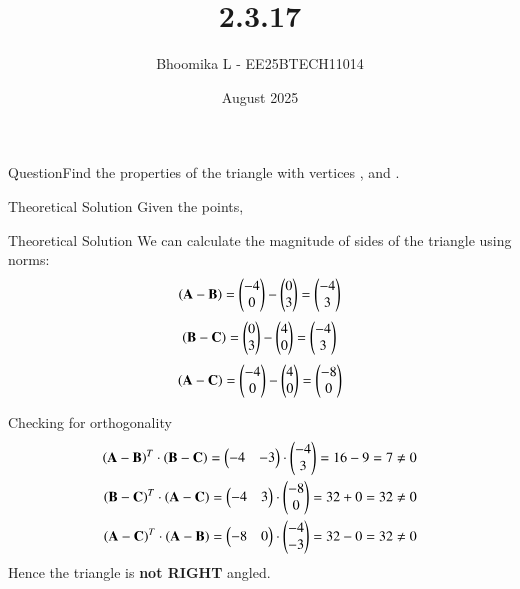 \documentclass{beamer}
\title %
{2.3.17}
\date{August  2025}
\author %
{Bhoomika L - EE25BTECH11014}
\begin{document}
\frame{\titlepage}
\begin{frame}{Question}Find the properties of the triangle with vertices , and .

\end{frame}

\begin{frame}{Theoretical Solution}
Given the points,
\begin{table}[H]    
  \centering
  
  \caption{Variables used.}
  \label{tab:2.3.17}
\end{table}
\end{frame}

\begin{frame}{Theoretical Solution}
We can calculate the magnitude of sides of the triangle using norms:
\begin{align}
    \left(\mathbf{A}-\mathbf{B}\right)=\begin{pmatrix}-4\\0\end{pmatrix}-\begin{pmatrix}0\\3\end{pmatrix}=\begin{pmatrix}-4\\3\end{pmatrix}
\end{align}
\begin{align}
 \left(\mathbf{B}-\mathbf{C}\right)=\begin{pmatrix}0\\3\end{pmatrix}-\begin{pmatrix}4\\0\end{pmatrix}=\begin{pmatrix}-4\\3\end{pmatrix}
 \end{align}
 \begin{align}
 \left(\mathbf{A}-\mathbf{C}\right)=\begin{pmatrix}-4\\0\end{pmatrix}-\begin{pmatrix}4\\0\end{pmatrix}=\begin{pmatrix}-8\\0\end{pmatrix}
 \end{align}
\end{frame}

\begin{frame}{Checking for orthogonality}
\begin{align}
 \left(\mathbf{A}-\mathbf{B}\right)^T \cdot \left( \mathbf{B}-\mathbf{C}\right)=\begin{pmatrix}-4&-3\end{pmatrix}\cdot \begin{pmatrix}-4\\3\end{pmatrix}=16-9=7\neq 0\\
     \left( \mathbf{B}-\mathbf{C}\right)^T \cdot  \left(\mathbf{A}-\mathbf{C}\right)= \begin{pmatrix}-4&3\end{pmatrix} \cdot \begin{pmatrix}-8\\0\end{pmatrix}=32+0=32 \neq 0\\
      \left(\mathbf{A}-\mathbf{C}\right)^T \cdot \left(\mathbf{A}-\mathbf{B}\right)=\begin{pmatrix}-8&0\end{pmatrix} \cdot \begin{pmatrix}-4\\-3\end{pmatrix}=32-0=32 \neq 0\\
\end{align}
 Hence the triangle is \textbf{not RIGHT} angled.
\end{frame}
\end{document}
